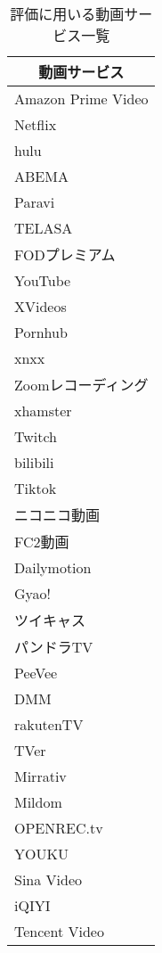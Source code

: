 \begin{table}[htbp]
  \label{tb:evl-video-service-list}
  \caption{評価に用いる動画サービス一覧}
  \begin{center}
    \begin{tabular}{|l|}
    \hline
    \multicolumn{1}{|c|}{\textbf{動画サービス}} \\\hline
    Amazon Prime Video \\ \hline
    Netflix \\ \hline
    hulu \\ \hline
    ABEMA \\ \hline
    Paravi \\ \hline
    TELASA \\ \hline
    FODプレミアム \\ \hline
    YouTube \\ \hline
    XVideos \\ \hline
    Pornhub \\ \hline
    xnxx \\ \hline
    Zoomレコーディング \\ \hline
    xhamster \\ \hline
    Twitch \\ \hline
    bilibili \\ \hline
    Tiktok \\ \hline
    ニコニコ動画 \\ \hline
    FC2動画 \\ \hline
    Dailymotion \\ \hline
    Gyao! \\ \hline
    ツイキャス \\ \hline
    パンドラTV \\ \hline
    PeeVee \\ \hline
    DMM \\ \hline
    rakutenTV \\ \hline
    TVer \\ \hline
    Mirrativ \\ \hline
    Mildom \\ \hline
    OPENREC.tv \\ \hline
    YOUKU \\ \hline
    Sina Video \\ \hline
    iQIYI \\ \hline
    Tencent Video \\ \hline
    \end{tabular}
  \end{center}
\end{table}

